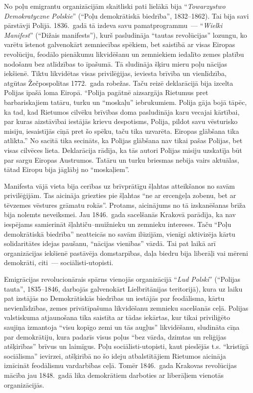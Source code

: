 \documentclass[twoside,a5paper,12pt,fleqn,openany]{extbook}
\newcommand{\pltxti}[1]{\textit{\textpolish{#1}}}
\begin{document}
No poļu emigrantu organizācijām skaitliski pati lielākā bija ``\pltxti{Towarzystwo Demokratyczne Polskie}'' (``Poļu demokrātiskā biedrība'', 1832--1862). Tai bija savi pārstāvji Polijā. 1836.~gadā tā izdeva savu pamatprogrammu~--- ``\pltxti{Wielki Manifest}'' (``Dižais manifests''), kurš pasludināja ``tautas revolūcijas'' lozungu, ko varētu īstenot galvenokārt zemniecības spēkiem, bet saistībā ar visas Eiropas revolūciju, feodālo pienākumu likvidēšanu un zemniekiem iedalīto zemes platību nodošanu bez atlīdzības to īpašumā. Tā sludināja šķiru mieru poļu nācijas iekšienē. Tiktu likvidētas visas privilēģijas, ieviesta brīvība un vienlīdzība, atgūtas Žečpospolitas 1772.~gada robežas. Taču reizē deklarācijā bija izcelta Polijas īpašā loma Eiropā. ``Polija pagātnē aizsargāja Rietumus pret barbariskajiem tatāru, turku un ``moskaļu'' iebrukumiem. Polija gāja bojā tāpēc, ka tad, kad Rietumos cilvēku brīvības doma pasludināja karu vecajai kārtībai, par kuras aizstāvībai iestājās krievu despotisms, Polija, pildot savu vēsturisko misiju, iesaistījās cīņā pret šo spēku, taču tika uzvarēta. Eiropas glābšana tika atlikta.'' No sacītā tika secināts, ka Polijas glābšana nav tikai pašas Polijas, bet visas cilvēces lieta. Deklarācija rādīja, ka tās autori Polijas misiju uzskatīja būt par sargu Eiropas Austrumos. Tatāru un turku briesmas nebija vairs aktuālas, tātad Eiropu bija jāglābj no ``moskaļiem''.

Manifesta vājā vieta bija cerības uz brīvprātīgu šļahtas atteikšanos no savām privilēģijām. Tas aicināja griezties pie šļahtas ``ne ar ercenģeļa zobenu, bet ar tēvzemes vēstures grāmatu rokās''. Protams, aicinājums no tā izskanēšanas brīža bija nolemts neveiksmei. Jau 1846.~gada sacelšanās Krakovā parādīja, ka nav iespējams samierināt šļahtiču--muižnieku un zemnieku intereses. Taču ``Poļu demokrātiskā biedrība'' neatteicās no savām ilūzijām, vienīgi aktivizēja kārtu solidaritātes idejas paušanu, ``nācijas vienības'' vārdā. Tai pat laikā arī organizācijas iekšienē pastāvēja domstarpības, daļa biedru bija liberāļi vai mēreni demokrāti, citi~--- sociālisti-utopisti.

Emigrācijas revolucionārais spārns vienojās organizācijā ``\pltxti{Lud Polski}'' (``Polijas tauta'', 1835--1846, darbojās galvenokārt Lielbritānijas teritorijā), kura uz laiku pat izstājās no Demokrātiskās biedrības un iestājās par feodālisma, kārtu nevienlīdzības, zemes privātīpašuma likvidēšanu zemnieku sacelšanās ceļā. Polijas valstiskuma atjaunošana tika saistīta ar tādas iekārtas, kur tikai priviliģēto saujiņa izmantoja ``visu kopīgo zemi un tās augļus'' likvidēšanu, sludināta cīņa par demokrātiju, kura padarīs visus poļus ``bez vārda, dzimtas un reliģijas atšķirības'' brīvus un laimīgus. Poļu sociālisti-utopisti, kaut pieslējās t.s. ``kristīgā sociālisma'' ievirzei, atšķirībā no šo ideju atbalstītājiem Rietumos aicināja iznīcināt feodālismu vardarbības ceļā. Tomēr 1846.~gada Krakovas revolūcijas mācība jau 1848.~gadā lika demokrātiem darboties ar liberāļiem vienotās organizācijās.
\end{document}
